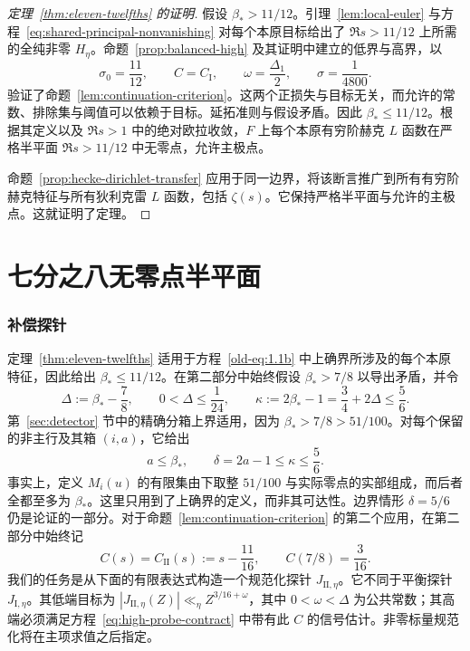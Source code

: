 \documentclass[11pt,a4paper]{article}
\numberwithin{equation}{section}
\numberwithin{figure}{section}
\theoremstyle{definition}
\theoremstyle{remark}
\begin{document}
\begin{proof}[定理~\ref{thm:eleven-twelfths} 的证明]
假设 $\beta_*>11/12$。引理~\ref{lem:local-euler} 与方程~\eqref{eq:shared-principal-nonvanishing} 对每个本原目标给出了 $\Re s>11/12$ 上所需的全纯非零 $H_\eta$。命题~\ref{prop:balanced-high} 及其证明中建立的低界与高界，以
\[
 \sigma_0=\frac{11}{12},\qquad C=C_{\mathrm I},\qquad
 \omega=\frac{\Delta_1}{2},\qquad \sigma=\frac1{4800}.
\]
验证了命题~\ref{lem:continuation-criterion}。这两个正损失与目标无关，而允许的常数、排除集与阈值可以依赖于目标。延拓准则与假设矛盾。因此 $\beta_*\le11/12$。根据其定义以及 $\Re s>1$ 中的绝对欧拉收敛，$F$ 上每个本原有穷阶赫克 $L$ 函数在严格半平面 $\Re s>11/12$ 中无零点，允许主极点。

命题~\ref{prop:hecke-dirichlet-transfer} 应用于同一边界，将该断言推广到所有有穷阶赫克特征与所有狄利克雷 $L$ 函数，包括 $\zeta(s)$。它保持严格半平面与允许的主极点。这就证明了定理。
\end{proof}

\part{七分之八无零点半平面}
\label{part:seven-eighths}

\section{补偿探针}\label{sec:compensation}

定理~\ref{thm:eleven-twelfths} 适用于方程~\eqref{old-eq:1.1b} 中上确界所涉及的每个本原特征，因此给出 $\beta_*\le11/12$。在第二部分中始终假设 $\beta_*>7/8$ 以导出矛盾，并令
\begin{equation}\label{eq:part-II-bootstrap}
 \Delta:=\beta_*-\frac78,\qquad 0<\Delta\le\frac1{24},
 \qquad
 \kappa:=2\beta_*-1=\frac34+2\Delta\le\frac56.
\end{equation}
第~\ref{sec:detector} 节中的精确分箱上界适用，因为 $\beta_*>7/8>51/100$。对每个保留的非主行及其箱 $(i,a)$，它给出
\begin{equation}\label{eq:part-II-bin-ceiling}
 a\le\beta_*,\qquad \delta=2a-1\le\kappa\le\frac56.
\end{equation}
事实上，定义 $M_i(u)$ 的有限集由下取整 $51/100$ 与实际零点的实部组成，而后者全都至多为 $\beta_*$。这里只用到了上确界的定义，而非其可达性。边界情形 $\delta=5/6$ 仍是论证的一部分。对于命题~\ref{lem:continuation-criterion} 的第二个应用，在第二部分中始终记
\begin{equation}\label{eq:part-II-mellin-target}
 C(s)=C_{\mathrm{II}}(s):=s-\frac{11}{16},\qquad
 C(7/8)=\frac3{16}.
\end{equation}
我们的任务是从下面的有限表达式构造一个规范化探针 $J_{\mathrm{II},\eta}$。它不同于平衡探针 $J_{\mathrm I,\eta}$。其低端目标为 $|J_{\mathrm{II},\eta}(Z)|\ll_\eta Z^{3/16+\omega}$，其中 $0<\omega<\Delta$ 为公共常数；其高端必须满足方程~\eqref{eq:high-probe-contract} 中带有此 $C$ 的信号估计。非零标量规范化将在主项求值之后指定。
\end{document}
